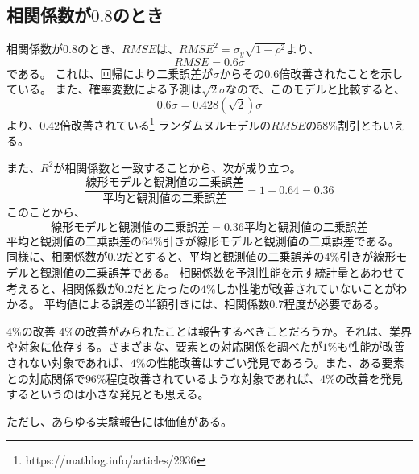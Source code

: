 \subsection{相関係数が$0.8$のとき}
相関係数が$0.8$のとき、$RMSE$は、$RMSE^2 = \sigma_y\sqrt{1-\rho^2}$より、
\begin{equation*}
 RMSE = 0.6\sigma
\end{equation*}
である。
これは、回帰により二乗誤差が$\sigma$からその$0.6$倍改善されたことを示している。
また、確率変数による予測は$\sqrt{2}\sigma$なので、このモデルと比較すると、
\begin{equation*}
 0.6\sigma = 0.428(\sqrt{2})\sigma
\end{equation*}
より、$0.42倍$改善されている\footnote{https://mathlog.info/articles/2936}
ランダムヌルモデルの$RMSE$の$58\%$割引ともいえる。

また、$R^2$が相関係数と一致することから、次が成り立つ。
\begin{equation*}
 \frac{線形モデルと観測値の二乗誤差}{平均と観測値の二乗誤差} = 1-0.64 = 0.36
\end{equation*}
このことから、
\begin{equation*}
 線形モデルと観測値の二乗誤差 = 0.36平均と観測値の二乗誤差
\end{equation*}
平均と観測値の二乗誤差の$64\%$引きが線形モデルと観測値の二乗誤差である。
同様に、相関係数が$0.2$だとすると、平均と観測値の二乗誤差の$4\%$引きが線形モデルと観測値の二乗誤差である。
相関係数を予測性能を示す統計量とあわせて考えると、相関係数が$0.2$だとたったの$4\%$しか性能が改善されていないことがわかる。
平均値による誤差の半額引きには、相関係数$0.7$程度が必要である。

\begin{SMbox}{$4\%$の改善}
 $4\%$の改善がみられたことは報告するべきことだろうか。それは、業界や対象に依存する。さまざまな、要素との対応関係を調べたが$1\%$も性能が改善されない対象であれば、$4\%$の性能改善はすごい発見であろう。また、ある要素との対応関係で$96\%$程度改善されているような対象であれば、$4\%$の改善を発見するというのは小さな発見とも思える。

 ただし、あらゆる実験報告には価値がある。
\end{SMbox}


